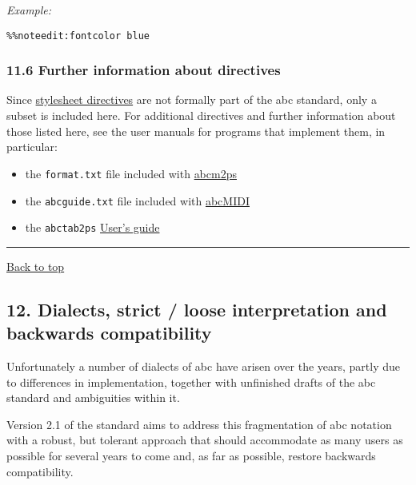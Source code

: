 \emph{Example:}

\begin{verbatim}
%%noteedit:fontcolor blue
\end{verbatim}

\hypertarget{further_information_about_directives}{\subsubsection{11.6
Further information about
directives}\label{further_information_about_directives}}

Since \protect\hyperlink{stylesheet_directive_definition}{stylesheet
directives} are not formally part of the abc standard, only a subset is
included here. For additional directives and further information about
those listed here, see the user manuals for programs that implement
them, in particular:

\begin{itemize}
\item
  the \texttt{format.txt} file included with
  \href{http://moinejf.free.fr/}{abcm2ps}
\item
  the \texttt{abcguide.txt} file included with
  \href{http://abc.sourceforge.net/abcMIDI/}{abcMIDI}
\item
  the \texttt{abctab2ps}
  \href{http://www.lautengesellschaft.de/cdmm/userguide/userguide.html}{User's
  guide}
\end{itemize}

\begin{center}\rule{0.5\linewidth}{\linethickness}\end{center}

\protect\hyperlink{}{Back to top}

\hypertarget{dialects_strict_loose_interpretation_and_backwards_compatibility}{\subsection{12.
Dialects, strict / loose interpretation and backwards
compatibility}\label{dialects_strict_loose_interpretation_and_backwards_compatibility}}

Unfortunately a number of dialects of abc have arisen over the years,
partly due to differences in implementation, together with unfinished
drafts of the abc standard and ambiguities within it.

Version 2.1 of the standard aims to address this fragmentation of abc
notation with a robust, but tolerant approach that should accommodate as
many users as possible for several years to come and, as far as
possible, restore backwards compatibility.

